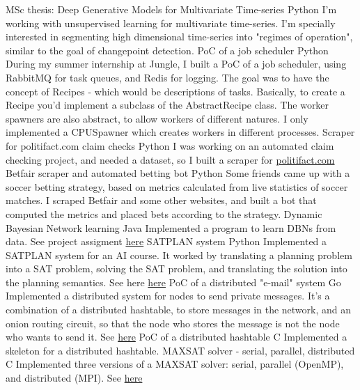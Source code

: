 \documentclass[]{colobas-cv}
\begin{document}
\entry
  {}
  {MSc thesis: Deep Generative Models for Multivariate Time-series}
  {Python}
  {I'm working with unsupervised learning for multivariate time-series. I'm
  specially interested in segmenting high dimensional time-series into
  "regimes of operation", similar to the goal of changepoint detection.}
\entry
  {}
  {PoC of a job scheduler}
  {Python}
  {During my summer internship at Jungle, I built a PoC of a job scheduler,
  using RabbitMQ for task queues, and Redis for logging. The goal was to have
  the concept of Recipes - which would be descriptions of tasks. Basically,
  to create a Recipe you'd implement a subclass of the AbstractRecipe class.
  The worker spawners are also abstract, to allow workers of different natures.
  I only implemented a CPUSpawner which creates workers in different processes.}
\entry
  {}
  {Scraper for politifact.com claim checks}
  {Python}
  {I was working on an automated claim checking project, and needed a dataset,
  so I built a scraper for \href{politifact.com}{politifact.com}}
\entry
  {}
  {Betfair scraper and automated betting bot}
  {Python}
  {Some friends came up with a soccer betting strategy, based on metrics 
  calculated from live statistics of soccer matches. I scraped Betfair and some
  other websites, and built a bot that computed the metrics and placed bets
  according to the strategy.}
\entry
  {}
  {Dynamic Bayesian Network learning}
  {Java}
  {Implemented a program to learn DBNs from data. See project assigment 
  \href{https://fenix.tecnico.ulisboa.pt/downloadFile/1689468335554723/apresentacao-projecto-POO1415.pdf}{here}}
\entry
  {}
  {SATPLAN system}
  {Python}
  {Implemented a SATPLAN system for an AI course. It worked by translating a
  planning problem into a SAT problem, solving the SAT problem, and translating
  the solution into the planning semantics. See here \href{https://github.com/colobas/ia-proj2}{here}}
\entry
  {}
  {PoC of a distributed "e-mail" system}
  {Go}
  {Implemented a distributed system for nodes to send private messages. It's a
  combination of a distributed hashtable, to store messages in the network, and
  an onion routing circuit, so that the node who stores the message is not the
  node who wants to send it. See \href{https://github.com/colobas/distributed-email}{here}}
\entry
  {}
  {PoC of a distributed hashtable}
  {C}
  {Implemented a skeleton for a distributed hashtable.}
\entry
  {}
  {MAXSAT solver - serial, parallel, distributed}
  {C}
  {Implemented three versions of a MAXSAT solver: serial, parallel (OpenMP), and
  distributed (MPI). See \href{https://github.com/colobas/maxsat-solver}{here}}
\end{document}
